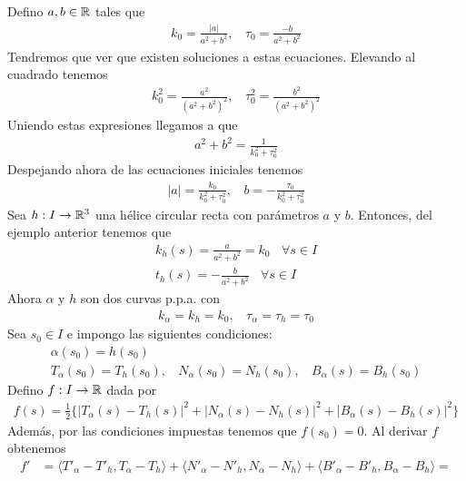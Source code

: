 \begin{ejercicio}
\begin{enumerate}
        Defino $a,b \in \mathbb{R}$ tales que 
        \begin{gather*}
            k_0 = \frac{|a|}{a^2 + b^2},\ \ \ \
            \tau_0 = \frac{-b}{a^2 + b^2}
        \end{gather*}
        Tendremos que ver que existen soluciones a estas ecuaciones. Elevando al cuadrado tenemos 
        \begin{gather*}
            k_0^2 = \frac{a^2}{(a^2 + b^2)^2},\ \ \ \
            \tau_0^2 = \frac{b^2}{(a^2 + b^2)^2}
        \end{gather*}
        Uniendo estas expresiones llegamos a que 
        \begin{gather*}
            a^2 + b^2 = \frac{1}{k_0^2 + \tau_0^2}
        \end{gather*}
        Despejando ahora de las ecuaciones iniciales tenemos 
        \begin{gather*}
            |a| = \frac{k_0}{k_0^2 + \tau_0^2},\ \ \ \ b = - \frac{\tau_0}{k_0^2 + \tau_0^2}
        \end{gather*}
        Sea $h:I\to \mathbb{R}^3$ una hélice circular recta con parámetros $a$ y $b$. Entonces, del ejemplo anterior tenemos que 
        \begin{gather*}
            k_h(s) = \frac{a}{a^2 + b^2} = k_0\ \ \ \ \forall s \in I\\
            t_h(s) = - \frac{b}{a^2 + b^2}\ \ \ \ \forall s \in I
        \end{gather*}
        Ahora $\alpha$ y $h$ son dos curvas p.p.a. con 
        \begin{gather*}
            k_\alpha = k_h = k_0,\ \ \ \ \tau_\alpha = \tau_h = \tau_0
        \end{gather*}
        Sea $s_0\in I$ e impongo las siguientes condiciones:
        \begin{gather*}
            \alpha(s_0)=h(s_0)\\
            T_\alpha(s_0) = T_h(s_0),\ \ \ \ N_\alpha(s_0) = N_h(s_0),\ \ \ \ B_\alpha(s) = B_h(s_0)
        \end{gather*}
        Defino $f:I\to \mathbb{R}$ dada por 
        \begin{gather*}
            f(s) = \frac{1}{2} \{|T_\alpha(s) - T_h(s)|^2 + |N_\alpha(s) - N_h(s)|^2 + |B_\alpha(s) - B_h(s)|^2\}
        \end{gather*}
        Además, por las condiciones impuestas tenemos que $f(s_0)=0$. Al derivar $f$ obtenemos 
        \begin{align*}
            f' &= \langle T'_\alpha - T'_h, T_\alpha - T_h\rangle + \langle N'_\alpha - N'_h, N_\alpha - N_h\rangle + \langle B'_\alpha - B'_h, B_\alpha - B_h\rangle = \\

\end{align*}
\end{enumerate}
\end{ejercicio}
